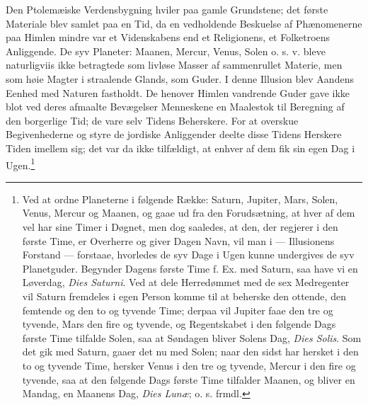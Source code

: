 \documentclass[12pt,a4paper]{book}
\begin{document}
Den Ptolemæiske Verdensbygning hviler paa gamle Grundstene; det første
Materiale blev samlet paa en Tid, da en vedholdende Beskuelse af
Phænomenerne paa Himlen mindre var et Videnskabens end et Religionens,
et Folketroens Anliggende. De syv Planeter: Maanen, Mercur, Venus,
Solen o. s. v. bleve naturligviis ikke betragtede som livløse Masser af
sammenrullet Materie, men som høie Magter i straalende Glands, som
Guder. I denne Illusion blev Aandens Eenhed med Naturen fastholdt. De
henover Himlen vandrende Guder gave ikke blot ved deres afmaalte
Bevægelser Menneskene en Maalestok til Beregning af den borgerlige Tid;
de vare selv Tidens Beherskere. For at overskue Begivenhederne og styre
de jordiske Anliggender deelte disse Tidens Herskere Tiden imellem sig;
det var da ikke tilfældigt, at enhver af dem fik sin egen Dag i
Ugen.\footnote{%
Ved at ordne Planeterne i følgende Række: Saturn, Jupiter, Mars, Solen,
Venus, Mercur og Maanen, og gaae ud fra den Forudsætning, at hver af
dem vel har sine Timer i Døgnet, men dog saaledes, at den, der regjerer
i den første Time, er Overherre og giver Dagen Navn, vil man i ---
Illusionens Forstand --- forstaae, hvorledes de syv Dage i Ugen kunne
undergives de syv Planetguder. Begynder Dagens første Time f. Ex. med
Saturn, saa have vi en Løverdag, \textit{Dies Saturni}. Ved at dele
Herredømmet med de sex Medregenter vil Saturn fremdeles i egen Person
komme til at beherske den ottende, den femtende og den to og tyvende
Time; derpaa vil Jupiter faae den tre og tyvende, Mars den fire og
tyvende, og Regentskabet i den følgende Dags første Time tilfalde
Solen, saa at Søndagen bliver Solens Dag, \textit{Dies Solis}. Som det
gik med Saturn, gaaer det nu med Solen; naar den sidst har hersket i
den to og tyvende Time, hersker Venus i den tre og tyvende, Mercur i
den fire og tyvende, saa at den følgende Dags første Time tilfalder
Maanen, og bliver en Mandag, en Maanens Dag, \textit{Dies Lunæ}; o. s.
frmdl.}
\end{document}
